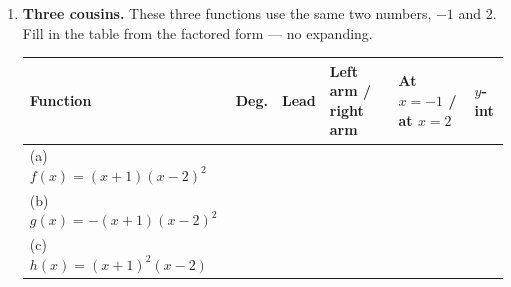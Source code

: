 \documentclass[10pt]{article}
\begin{document}
\begin{tcolorbox}[colback=white, colframe=black!40, title=\textbf{Tier R --- Remediate},
    fonttitle=\bfseries, arc=1.5mm, left=3mm, right=3mm, top=2mm, bottom=2mm, breakable]
\begin{enumerate}[leftmargin=1.7em, itemsep=9pt]
  \item \textbf{Three cousins.} These three functions use the same two numbers, $-1$ and $2$. Fill in
    the table from the factored form --- no expanding.

    \vspace{3pt}
    \renewcommand{\arraystretch}{1.5}
    \begin{tabularx}{\linewidth}{|X|C{1.2cm}|C{1.4cm}|C{2.6cm}|C{2.6cm}|C{1.6cm}|}
    \hline
    \textbf{Function} & \textbf{Deg.} & \textbf{Lead} & \textbf{Left arm / right arm} & \textbf{At $x=-1$ / at $x=2$} & \textbf{$y$-int} \\ \hline
    (a) $f(x)=(x+1)(x-2)^2$  & & & & & \\ \hline
    (b) $g(x)=-(x+1)(x-2)^2$ & & & & & \\ \hline
    (c) $h(x)=(x+1)^2(x-2)$  & & & & & \\ \hline
    \end{tabularx}


\end{enumerate}
\end{tcolorbox}
\end{document}
